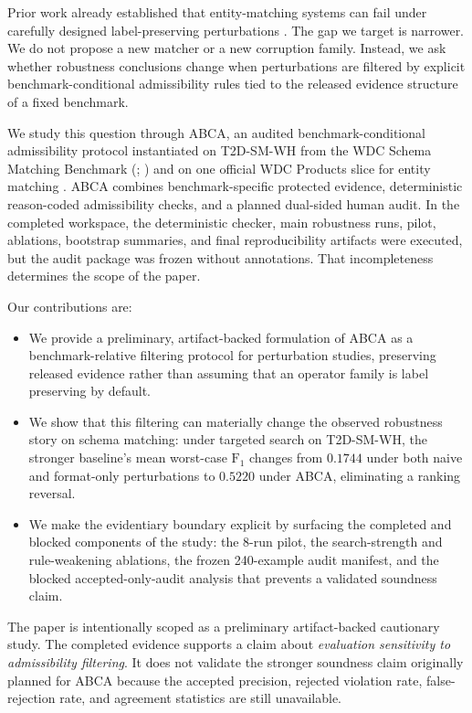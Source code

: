 \documentclass{article}
\newcommand{\abca}{\textsc{ABCA}}
\newcommand{\fonescore}{\ensuremath{\mathrm{F}_{1}}}
\begin{document}
Prior work already established that entity-matching systems can fail under carefully designed label-preserving perturbations \citep{rastaghi2022probing}. The gap we target is narrower. We do not propose a new matcher or a new corruption family. Instead, we ask whether robustness conclusions change when perturbations are filtered by explicit benchmark-conditional admissibility rules tied to the released evidence structure of a fixed benchmark.

We study this question through \abca{}, an audited benchmark-conditional admissibility protocol instantiated on T2D-SM-WH from the WDC Schema Matching Benchmark (\citealt{der2023wdcsmb}; \citealt{peeters2024schemaorgtables}) and on one official WDC Products slice for entity matching \citep{peeters2024wdcproducts}. \abca{} combines benchmark-specific protected evidence, deterministic reason-coded admissibility checks, and a planned dual-sided human audit. In the completed workspace, the deterministic checker, main robustness runs, pilot, ablations, bootstrap summaries, and final reproducibility artifacts were executed, but the audit package was frozen without annotations. That incompleteness determines the scope of the paper.

Our contributions are:
\begin{itemize}
  \item We provide a preliminary, artifact-backed formulation of \abca{} as a benchmark-relative filtering protocol for perturbation studies, preserving released evidence rather than assuming that an operator family is label preserving by default.
  \item We show that this filtering can materially change the observed robustness story on schema matching: under targeted search on T2D-SM-WH, the stronger baseline's mean worst-case \fonescore{} changes from $0.1744$ under both naive and format-only perturbations to $0.5220$ under \abca{}, eliminating a ranking reversal.
  \item We make the evidentiary boundary explicit by surfacing the completed and blocked components of the study: the 8-run pilot, the search-strength and rule-weakening ablations, the frozen 240-example audit manifest, and the blocked accepted-only-audit analysis that prevents a validated soundness claim.
\end{itemize}

The paper is intentionally scoped as a preliminary artifact-backed cautionary study. The completed evidence supports a claim about \emph{evaluation sensitivity to admissibility filtering}. It does not validate the stronger soundness claim originally planned for \abca{} because the accepted precision, rejected violation rate, false-rejection rate, and agreement statistics are still unavailable.
\end{document}
